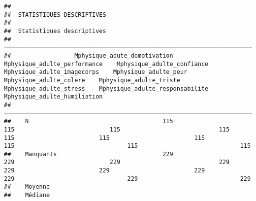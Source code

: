 \documentclass[
]{article}
\begin{document}
\begin{verbatim}
## 
##  STATISTIQUES DESCRIPTIVES
## 
##  Statistiques descriptives                                                                                                                                                                                                                                                                                                
##  ──────────────────────────────────────────────────────────────────────────────────────────────────────────────────────────────────────────────────────────────────────────────────────────────────────────────────────────────────────────────────────────────────────────────────────────────────────────────────────── 
##                  Mphysique_adute_domotivation    Mphysique_adulte_performance    Mphysique_adulte_confiance    Mphysique_adulte_imagecorps    Mphysique_adulte_peur    Mphysique_adulte_colere    Mphysique_adulte_triste    Mphysique_adulte_stress    Mphysique_adulte_responsabilite    Mphysique_adulte_humiliation   
##  ──────────────────────────────────────────────────────────────────────────────────────────────────────────────────────────────────────────────────────────────────────────────────────────────────────────────────────────────────────────────────────────────────────────────────────────────────────────────────────── 
##    N                                      115                             115                           115                            115                      115                        115                        115                        115                                115                             115   
##    Manquants                              229                             229                           229                            229                      229                        229                        229                        229                                229                             229   
##    Moyenne                                                                                                                                                                                                                                                                                                                
##    Médiane                                                                                                                                                                                                                                                                                                                

\end{verbatim}
\end{document}
